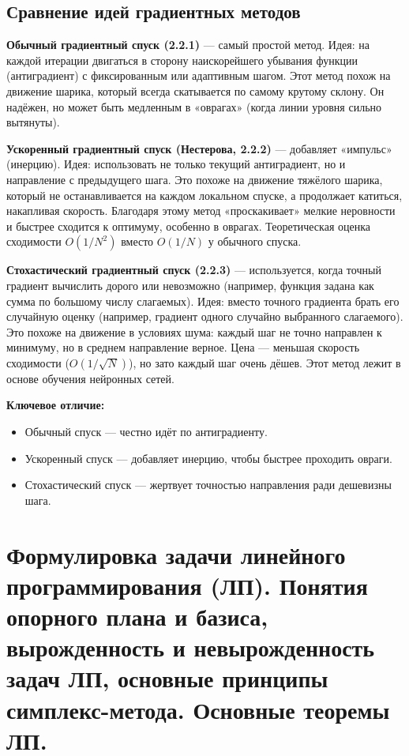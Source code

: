\documentclass{article}
\theoremstyle{plain}
\begin{document}
\subsection{Сравнение идей градиентных методов}

\textbf{Обычный градиентный спуск (2.2.1)} — самый простой метод. Идея: на каждой итерации двигаться в сторону наискорейшего убывания функции (антиградиент) с фиксированным или адаптивным шагом. Этот метод похож на движение шарика, который всегда скатывается по самому крутому склону. Он надёжен, но может быть медленным в «оврагах» (когда линии уровня сильно вытянуты).

\textbf{Ускоренный градиентный спуск (Нестерова, 2.2.2)} — добавляет «импульс» (инерцию). Идея: использовать не только текущий антиградиент, но и направление с предыдущего шага. Это похоже на движение тяжёлого шарика, который не останавливается на каждом локальном спуске, а продолжает катиться, накапливая скорость. Благодаря этому метод «проскакивает» мелкие неровности и быстрее сходится к оптимуму, особенно в оврагах. Теоретическая оценка сходимости $O(1/N^2)$ вместо $O(1/N)$ у обычного спуска.

\textbf{Стохастический градиентный спуск (2.2.3)} — используется, когда точный градиент вычислить дорого или невозможно (например, функция задана как сумма по большому числу слагаемых). Идея: вместо точного градиента брать его случайную оценку (например, градиент одного случайно выбранного слагаемого). Это похоже на движение в условиях шума: каждый шаг не точно направлен к минимуму, но в среднем направление верное. Цена — меньшая скорость сходимости ($O(1/\sqrt{N})$), но зато каждый шаг очень дёшев. Этот метод лежит в основе обучения нейронных сетей.

\textbf{Ключевое отличие:}
\begin{itemize}
\item Обычный спуск — честно идёт по антиградиенту.
\item Ускоренный спуск — добавляет инерцию, чтобы быстрее проходить овраги.
\item Стохастический спуск — жертвует точностью направления ради дешевизны шага.
\end{itemize}

\section{Формулировка задачи линейного программирования (ЛП). Понятия опорного плана и базиса, вырожденность и невырожденность задач ЛП, основные принципы симплекс-метода. Основные теоремы ЛП.}
\end{document}
